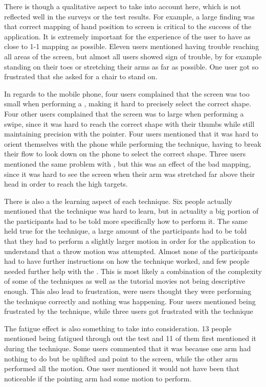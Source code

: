 There is though a qualitative aspect to take into account here, which is not reflected well in the surveys or the test results. For example, a large finding was that correct mapping of hand position to screen is critical to the success of the application.
It is extremely important for the experience of the user to have as close to 1-1 mapping as possible. 
Eleven users mentioned having trouble reaching all areas of the screen, but almost all users showed sign of trouble, by for example standing on their toes or stretching their arms as far as possible.
One user got so frustrated that she asked for a chair to stand on. 

In regards to the mobile phone, four users complained that the screen was too small when performing a \pinch, making it hard to precisely select the correct shape.
Four other users complained that the screen was to large when performing a swipe, since it was hard to reach the correct shape with their thumbs while still maintaining precision with the pointer. 
Four users mentioned that it was hard to orient themselves with the phone while performing the \throw technique, having to break their flow to look down on the phone to select the correct shape. 
Three users mentioned the same problem with \swipe, but this was an effect of the bad mapping, since it was hard to see the screen when their arm was stretched far above their head in order to reach the high targets. 

There is also a the learning aspect of each technique. Six people actually mentioned that the \pinch technique was hard to learn, but in actuality a big portion of the participants had to be told more specifically how to perform it. 
The same held true for the \throw technique, a large amount of the participants had to be told that they had to perform a slightly larger motion in order for the application to understand that a throw motion was attempted.
Almost none of the participants had to have further instructions on how the \swipe technique worked, and few people needed further help with the \tilt. 
This is most likely a combination of the complexity of some of the techniques as well as the tutorial movies not being descriptive enough. 
This also lead to frustration, were users thought they were performing the technique correctly and nothing was happening. 
Four users mentioned being frustrated by the \pinch technique, while three users got frustrated with the \tilt technique

The fatigue effect is also something to take into consideration. 13 people mentioned being fatigued through out the test and 11 of them first mentioned it during the \throw technique.
Some users commented that it was because one arm had nothing to do but be uplifted and point to the screen, while the other arm performed all the motion.
One user mentioned it would not have been that noticeable if the pointing arm had some motion to perform. 

